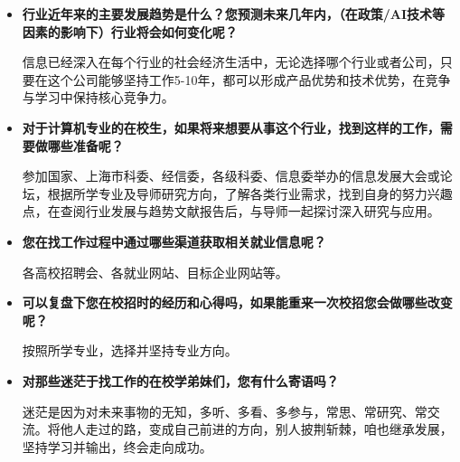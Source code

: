 \begin{itemize}
    \item \textbf{行业近年来的主要发展趋势是什么？您预测未来几年内，（在政策/AI技术等因素的影响下）行业将会如何变化呢？}

信息已经深入在每个行业的社会经济生活中，无论选择哪个行业或者公司，只要在这个公司能够坚持工作5-10年，都可以形成产品优势和技术优势，在竞争与学习中保持核心竞争力。

    \item \textbf{对于计算机专业的在校生，如果将来想要从事这个行业，找到这样的工作，需要做哪些准备呢？}

参加国家、上海市科委、经信委，各级科委、信息委举办的信息发展大会或论坛，根据所学专业及导师研究方向，了解各类行业需求，找到自身的努力兴趣点，在查阅行业发展与趋势文献报告后，与导师一起探讨深入研究与应用。

    \item \textbf{您在找工作过程中通过哪些渠道获取相关就业信息呢？}

各高校招聘会、各就业网站、目标企业网站等。

    \item \textbf{可以复盘下您在校招时的经历和心得吗，如果能重来一次校招您会做哪些改变呢？}

按照所学专业，选择并坚持专业方向。

    \item \textbf{对那些迷茫于找工作的在校学弟妹们，您有什么寄语吗？}

迷茫是因为对未来事物的无知，多听、多看、多参与，常思、常研究、常交流。将他人走过的路，变成自己前进的方向，别人披荆斩棘，咱也继承发展，坚持学习并输出，终会走向成功。

\end{itemize}
